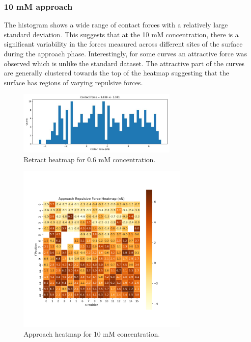 


\newpage
\subsubsection{10 mM approach}

The histogram shows a wide range of contact forces with a relatively large standard deviation. This suggests that at the 10 mM concentration, there is a significant variability in the forces measured across different sites of the surface during the approach phase. Interestingly, for some curves an attractive force was observed which is unlike the standard dataset. The attractive part of the curves are generally clustered towards the top of the heatmap suggesting that the surface has regions of varying repulsive forces. 

\begin{figure}[h!!!]
    \centering
    \includegraphics[width=0.7\textwidth]{chapter7/ForceMaps/10mM/approach_f_c_hist.jpg}
    \caption{Retract heatmap for 0.6 mM concentration.}
    \label{fig:appro_fc_10mM}
\end{figure}

\begin{figure}[h!!!!!]
    \centering
    \includegraphics[width=0.75\textwidth]{chapter7/ForceMaps/10mM/Approach heatmap.png}
    \caption{Approach heatmap for 10 mM concentration.}
    \label{fig:approach_heatmap_10mM}
\end{figure}


